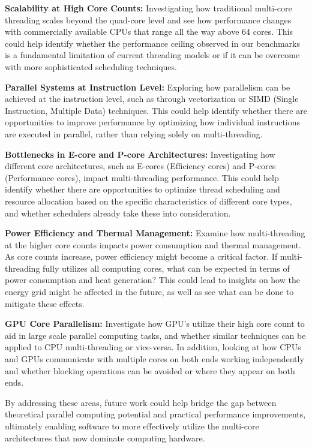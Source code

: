 \documentclass[12pt,a4paper]{article}
\begin{document}
\textbf{Scalability at High Core Counts:} Investigating how traditional multi-core threading scales beyond the quad-core level and see how performance changes with commercially available CPUs that range all the way above 64 cores. This could help identify whether the performance ceiling observed in our benchmarks is a fundamental limitation of current threading models or if it can be overcome with more sophisticated scheduling techniques.

\textbf{Parallel Systems at Instruction Level:} Exploring how parallelism can be achieved at the instruction level, such as through vectorization or SIMD (Single Instruction, Multiple Data) techniques. This could help identify whether there are opportunities to improve performance by optimizing how individual instructions are executed in parallel, rather than relying solely on multi-threading.

\textbf{Bottlenecks in E-core and P-core Architectures:} Investigating how different core architectures, such as E-cores (Efficiency cores) and P-cores (Performance cores), impact multi-threading performance. This could help identify whether there are opportunities to optimize thread scheduling and resource allocation based on the specific characteristics of different core types, and whether schedulers already take these into consideration. 

\textbf{Power Efficiency and Thermal Management:} Examine how multi-threading at the higher core counts impacts power consumption and thermal management. As core counts increase, power efficiency might become a critical factor. If multi-threading fully utilizes all computing cores, what can be expected in terms of power consumption and heat generation? This could lead to insights on how the energy grid might be affected in the future, as well as see what can be done to mitigate these effects.

\textbf{GPU Core Parallelism:} Investigate how GPU's utilize their high core count to aid in large scale parallel computing tasks, and whether similar techniques can be applied to CPU multi-threading or vice-versa. In addition, looking at how CPUs and GPUs communicate with multiple cores on both ends working independently and whether blocking operations can be avoided or where they appear on both ends.

By addressing these areas, future work could help bridge the gap between theoretical parallel computing potential and practical performance improvements, ultimately enabling software to more effectively utilize the multi-core architectures that now dominate computing hardware.
\end{document}
